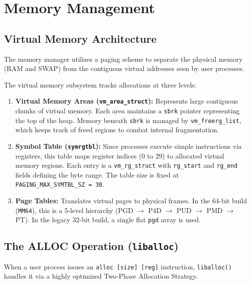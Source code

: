\section{Memory Management}
\subsection{Virtual Memory Architecture}
The memory manager utilizes a paging scheme to separate the physical memory (RAM and SWAP) from the contiguous virtual addresses seen by user processes.

The virtual memory subsystem tracks allocations at three levels:
\begin{enumerate}
    \item \textbf{Virtual Memory Areas (\texttt{vm\_area\_struct}):} Represents large contiguous chunks of virtual memory. Each area maintains a \texttt{sbrk} pointer representing the top of the heap. Memory beneath \texttt{sbrk} is managed by \texttt{vm\_freerg\_list}, which keeps track of freed regions to combat internal fragmentation.
    \item \textbf{Symbol Table (\texttt{symrgtbl}):} Since processes execute simple instructions via registers, this table maps register indices (0 to 29) to allocated virtual memory regions. Each entry is a \texttt{vm\_rg\_struct} with \texttt{rg\_start} and \texttt{rg\_end} fields defining the byte range. The table size is fixed at \texttt{PAGING\_MAX\_SYMTBL\_SZ = 30}.
    \item \textbf{Page Tables:} Translates virtual pages to physical frames. In the 64-bit build (\texttt{MM64}), this is a 5-level hierarchy (PGD $\to$ P4D $\to$ PUD $\to$ PMD $\to$ PT). In the legacy 32-bit build, a single flat \texttt{pgd} array is used.
\end{enumerate}

\subsection{The ALLOC Operation (\texttt{liballoc})}
When a user process issues an \texttt{alloc [size] [reg]} instruction, \texttt{liballoc()} handles it via a highly optimized Two-Phase Allocation Strategy.

